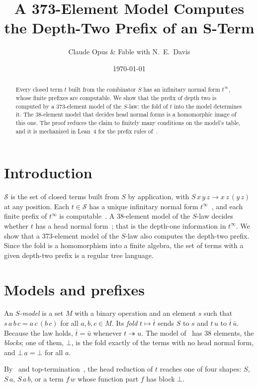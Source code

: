 \documentclass[11pt]{amsart}
\title{A 373-Element Model Computes the Depth-Two Prefix of an $\bm{S}$-Term}
\author{Claude Opus \& Fable with N.\ E.\ Davis}
\date{\today}
\theoremstyle{definition}
\newcommand{\Ter}{\mathcal S}
\begin{document}
\begin{abstract}
Every closed term $t$ built from the combinator $S$ has an infinitary normal form $t^\infty$, whose
finite prefixes are computable. We show that the prefix of depth two is computed by a 373-element
model of the $S$-law: the fold of $t$ into the model determines it. The 38-element model that decides
head normal forms is a homomorphic image of this one. The proof reduces the claim to finitely many conditions
on the model's table, and it is mechanized in Lean~4 for the prefix rules of~\citep{s3}.
\end{abstract}

\maketitle

\section{Introduction}

$\Ter$ is the set of closed terms built from $S$ by application, with $S\,x\,y\,z\to x\,z\,(y\,z)$ at
any position. Each $t\in\Ter$ has a unique infinitary normal form $t^\infty$~\citep{waldmann-thesis,s3},
and each finite prefix of $t^\infty$ is computable~\citep{s3}. A 38-element model of the $S$-law
decides whether $t$ has a head normal form~\citep{s1}; that is the depth-one information in
$t^\infty$. We show that a 373-element model of the $S$-law also computes the depth-two prefix. Since
the fold is a homomorphism into a finite algebra, the set of terms with a given depth-two prefix is a
regular tree language.

\section{Models and prefixes}

An \emph{$S$-model} is a set $M$ with a binary operation and an element $s$ such that
$s\,a\,b\,c=a\,c\,(b\,c)$ for all $a,b,c\in M$. Its \emph{fold} $t\mapsto\bar t$ sends $S$ to $s$ and
$t\,u$ to $\bar t\,\bar u$. Because the law holds, $\bar t=\bar u$ whenever $t\twoheadrightarrow u$.
The model of~\citep{s1} has 38 elements, the \emph{blocks}; one of them, $\bot$, is the fold exactly
of the terms with no head normal form, and $\bot\,a=\bot$ for all $a$.

By~\citep{s1} and top-termination~\citep{waldmann-thesis,s3}, the head reduction of $t$ reaches one
of four shapes: $S$, $S\,a$, $S\,a\,b$, or a term $f\,w$ whose function part $f$ has block $\bot$.
\end{document}
